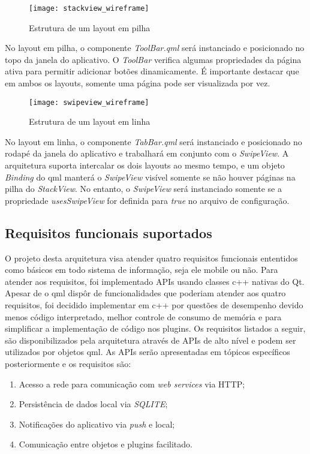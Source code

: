 \begin{figure}[H]
	\texttt{[image: stackview\_wireframe]}
	\centering
	\caption{Estrutura de um layout em pilha}
\end{figure}

No layout em pilha, o componente \textit{ToolBar.qml} será instanciado e posicionado no topo da janela do aplicativo. O \textit{ToolBar} verifica algumas propriedades da página ativa para permitir adicionar botões dinamicamente. É importante destacar que em ambos os layouts, somente uma página pode ser visualizada por vez.

\begin{figure}[H]
	\texttt{[image: swipeview\_wireframe]}
	\centering
	\caption{Estrutura de um layout em linha}
\end{figure}

No layout em linha, o componente \textit{TabBar.qml} será instanciado e posicionado no rodapé da janela do aplicativo e trabalhará em conjunto com o \textit{SwipeView}. A arquitetura suporta intercalar os dois layouts ao mesmo tempo, e um objeto \textit{Binding} do qml manterá o \textit{SwipeView} visível somente se não houver páginas na pilha do \textit{StackView}. No entanto, o \textit{SwipeView} será instanciado somente se a propriedade \textit{usesSwipeView} for definida para \textit{true} no arquivo de configuração.\par


\subsection{Requisitos funcionais suportados}
O projeto desta arquitetura visa atender quatro requisitos funcionais ententidos como básicos em todo sistema de informação, seja ele mobile ou não. Para atender aos requisitos, foi implementado APIs usando classes c++ nativas do Qt. Apesar de o qml dispôr de funcionalidades que poderiam atender aos quatro requisitos, foi decidido implementar em c++ por questões de desempenho devido menos código interpretado, melhor controle de consumo de memória e para simplificar a implementação de código nos plugins. Os requisitos listados a seguir, são disponibilizados pela arquitetura através de APIs de alto nível e podem ser utilizados por objetos qml. As APIs serão apresentadas em tópicos específicos posteriormente e os requisitos são:

\begin{enumerate}
	\item Acesso a rede para comunicação com \textit{web services} via HTTP;
	\item Persistência de dados local via \textit{SQLITE};
	\item Notificações do aplicativo via \textit{push} e local;
	\item Comunicação entre objetos e plugins facilitado.
\end{enumerate}


